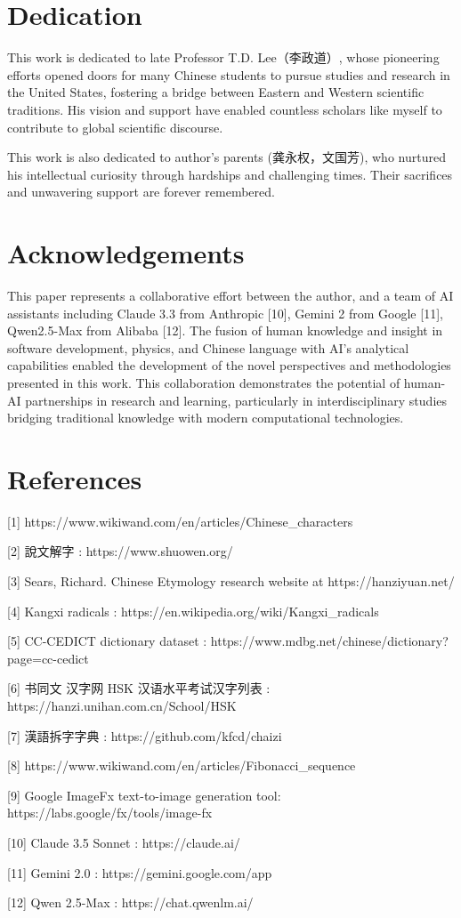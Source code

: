 \documentclass[11pt,letterpaper]{article}
\begin{document}
\section{Dedication}\label{dedication}

This work is dedicated to late Professor T.D. Lee（李政道）, whose
pioneering efforts opened doors for many Chinese students to pursue
studies and research in the United States, fostering a bridge between
Eastern and Western scientific traditions. His vision and support have
enabled countless scholars like myself to contribute to global
scientific discourse.

This work is also dedicated to author's parents (龚永权，文国芳), who
nurtured his intellectual curiosity through hardships and challenging
times. Their sacrifices and unwavering support are forever remembered.

\section{Acknowledgements}\label{acknowledgements}

This paper represents a collaborative effort between the author, and a
team of AI assistants including Claude 3.3 from Anthropic {[}10{]},
Gemini 2 from Google {[}11{]}, Qwen2.5-Max from Alibaba {[}12{]}. The
fusion of human knowledge and insight in software development, physics,
and Chinese language with AI's analytical capabilities enabled the
development of the novel perspectives and methodologies presented in
this work. This collaboration demonstrates the potential of human-AI
partnerships in research and learning, particularly in interdisciplinary
studies bridging traditional knowledge with modern computational
technologies.

\section{References}\label{references}

{[}1{]} https://www.wikiwand.com/en/articles/Chinese\_characters

{[}2{]} 說文解字 : https://www.shuowen.org/

{[}3{]} Sears, Richard. Chinese Etymology research website at
https://hanziyuan.net/

{[}4{]} Kangxi radicals : https://en.wikipedia.org/wiki/Kangxi\_radicals

{[}5{]} CC-CEDICT dictionary dataset :
https://www.mdbg.net/chinese/dictionary?page=cc-cedict

{[}6{]} 书同文 汉字网 HSK 汉语水平考试汉字列表 :
https://hanzi.unihan.com.cn/School/HSK

{[}7{]} 漢語拆字字典 : https://github.com/kfcd/chaizi

{[}8{]} https://www.wikiwand.com/en/articles/Fibonacci\_sequence

{[}9{]} Google ImageFx text-to-image generation tool:
https://labs.google/fx/tools/image-fx

{[}10{]} Claude 3.5 Sonnet : https://claude.ai/

{[}11{]} Gemini 2.0 : https://gemini.google.com/app

{[}12{]} Qwen 2.5-Max : https://chat.qwenlm.ai/
\end{document}
